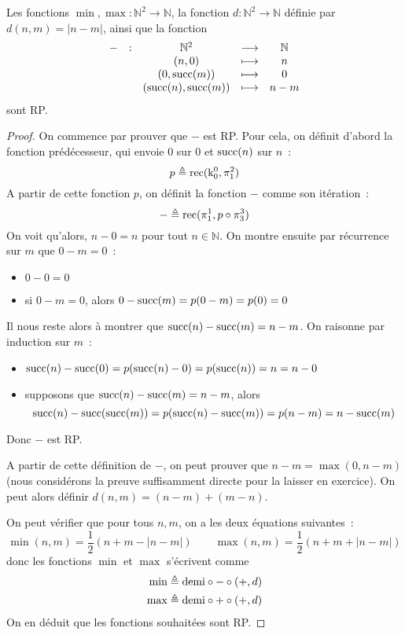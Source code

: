 \begin{proposition}
  Les fonctions $\min,\max : \mathbb N^2 \to \mathbb N$, la fonction
  $d : \mathbb N^2 \to \mathbb N$ définie par $d(n,m) = | n - m |$,
  ainsi que la fonction
  \[\begin{array}{ccccc}
  - &: & \mathbb N^2 &\longrightarrow & \mathbb N\\
  & & (n,0) & \longmapsto & n\\
  & & (0,\operatorname{succ}(m)) &\longmapsto & 0\\
  & & (\operatorname{succ}(n),\operatorname{succ}(m)) &\longmapsto & n - m
  \end{array}\]
  sont RP.
\end{proposition}

\begin{proof}
  On commence par prouver que $-$ est RP. Pour cela, on définit d'abord la
  fonction prédécesseur, qui envoie $0$ sur $0$ et $\operatorname{succ}(n)$ sur $n$~:
  \[p \triangleq \operatorname{rec}(\mathrm k_0^0,\pi_1^2)\]
  A partir de cette fonction $p$, on définit la fonction $-$ comme son
  itération~:
  \[- \triangleq \operatorname{rec}(\pi_1^1,p \circ \pi_3^3)\]
  On voit qu'alors, $n - 0 = n$ pour tout $n \in \mathbb N$. On montre ensuite
  par récurrence sur $m$ que $0 - m = 0$~:
  \begin{itemize}
  \item $0 - 0 = 0$
  \item si $0 - m = 0$, alors $0 - \operatorname{succ}(m) = p(0-m) = p(0) = 0$
  \end{itemize}
  Il nous reste alors à montrer que $\operatorname{succ}(n) - \operatorname{succ}(m) = n - m$. On raisonne
  par induction sur $m$~:
  \begin{itemize}
  \item $\operatorname{succ}(n) - \operatorname{succ}(0) = p(\operatorname{succ}(n) - 0) = p(\operatorname{succ}(n)) = n = n - 0$
  \item supposons que $\operatorname{succ}(n) - \operatorname{succ}(m) = n - m$, alors
    \[
    \operatorname{succ}(n) - \operatorname{succ}(\operatorname{succ}(m)) = p(\operatorname{succ}(n) - \operatorname{succ}(m)) = p(n - m)
    = n - \operatorname{succ}(m)
    \]
  \end{itemize}
  Donc $-$ est RP.

  A partir de cette définition de $-$, on peut prouver que $n-m = \max(0,n-m)$
  (nous considérons la preuve suffisamment directe pour la laisser en
  exercice). On peut alors définir $d(n,m) = (n - m) + (m - n)$.

  On peut vérifier que pour tous $n,m$, on a les deux équations suivantes~:
  \[\min(n,m) = \frac{1}{2}(n + m - |n - m|)\qquad
  \max(n,m) = \frac{1}{2}(n + m + |n - m|)\]
  donc les fonctions $\min$ et $\max$ s'écrivent comme
  \begin{align*}
    \min &\triangleq \mathrm{demi}\circ - \circ (+,d)\\
    \max &\triangleq \mathrm{demi}\circ + \circ (+,d)
  \end{align*}
  On en déduit que les fonctions souhaitées sont RP.
\end{proof}

